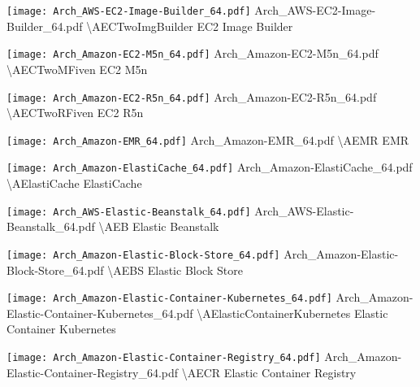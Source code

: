  {\texttt{[image: Arch\_AWS-EC2-Image-Builder\_64.pdf]}} {Arch\_AWS-EC2-Image-Builder\_64.pdf} {{\textbackslash}AECTwoImgBuilder} {EC2 Image Builder}

 {\texttt{[image: Arch\_Amazon-EC2-M5n\_64.pdf]}} {Arch\_Amazon-EC2-M5n\_64.pdf} {{\textbackslash}AECTwoMFiven} {EC2 M5n}

 {\texttt{[image: Arch\_Amazon-EC2-R5n\_64.pdf]}} {Arch\_Amazon-EC2-R5n\_64.pdf} {{\textbackslash}AECTwoRFiven} {EC2 R5n}

 {\texttt{[image: Arch\_Amazon-EMR\_64.pdf]}} {Arch\_Amazon-EMR\_64.pdf} {{\textbackslash}AEMR} {EMR}

 {\texttt{[image: Arch\_Amazon-ElastiCache\_64.pdf]}} {Arch\_Amazon-ElastiCache\_64.pdf} {{\textbackslash}AElastiCache} {ElastiCache}

 {\texttt{[image: Arch\_AWS-Elastic-Beanstalk\_64.pdf]}} {Arch\_AWS-Elastic-Beanstalk\_64.pdf} {{\textbackslash}AEB} {Elastic Beanstalk}

 {\texttt{[image: Arch\_Amazon-Elastic-Block-Store\_64.pdf]}} {Arch\_Amazon-Elastic-Block-Store\_64.pdf} {{\textbackslash}AEBS} {Elastic Block Store}

 {\texttt{[image: Arch\_Amazon-Elastic-Container-Kubernetes\_64.pdf]}} {Arch\_Amazon-Elastic-Container-Kubernetes\_64.pdf} {{\textbackslash}AElasticContainerKubernetes} {Elastic Container Kubernetes}

 {\texttt{[image: Arch\_Amazon-Elastic-Container-Registry\_64.pdf]}} {Arch\_Amazon-Elastic-Container-Registry\_64.pdf} {{\textbackslash}AECR} {Elastic Container Registry}

